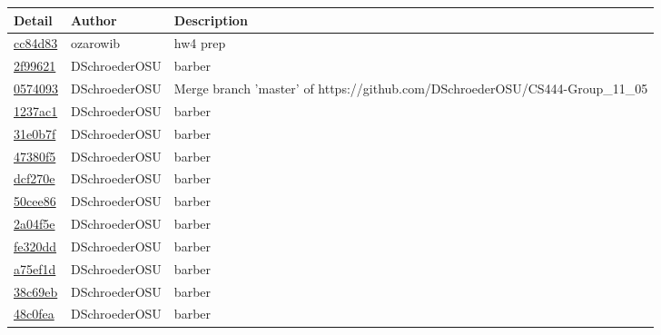 \documentclass[10pt,letterpaper,draftclsnofoot,onecolumn]{IEEEtran}
\begin{document}
\noindent\begin{tabular}{l l l}\textbf{Detail} & \textbf{Author} & \textbf{Description}\\\hline
\href{https://github.com/DSchroederOSU/CS444-Group\_11\_05/commit/cc84d834483d472b0d0c12d075555c2c3b960755}{cc84d83} & ozarowib & hw4 prep\\\hline
\href{https://github.com/DSchroederOSU/CS444-Group\_11\_05/commit/2f99621b3c19e6ce8239c9f4c1ea9f24902d77ee}{2f99621} & DSchroederOSU & barber\\\hline
\href{https://github.com/DSchroederOSU/CS444-Group\_11\_05/commit/0574093f826e27b1fc4e3d216da50c503b3015ed}{0574093} & DSchroederOSU & Merge branch 'master' of https://github.com/DSchroederOSU/CS444-Group\_11\_05\\\hline
\href{https://github.com/DSchroederOSU/CS444-Group\_11\_05/commit/1237ac17530a834d78a0d2a8d36924ec87a3c579}{1237ac1} & DSchroederOSU & barber\\\hline
\href{https://github.com/DSchroederOSU/CS444-Group\_11\_05/commit/31e0b7f7cf642c37f6cf6d436193976ea4d80ca7}{31e0b7f} & DSchroederOSU & barber\\\hline
\href{https://github.com/DSchroederOSU/CS444-Group\_11\_05/commit/47380f5ba2b7b07b547591b408d5e36e480b32ec}{47380f5} & DSchroederOSU & barber\\\hline
\href{https://github.com/DSchroederOSU/CS444-Group\_11\_05/commit/dcf270e08f46f7452e14335b29c5a1e64e54f015}{dcf270e} & DSchroederOSU & barber\\\hline
\href{https://github.com/DSchroederOSU/CS444-Group\_11\_05/commit/50cee86f1af5bc5267515775ee7cb5b64cf82418}{50cee86} & DSchroederOSU & barber\\\hline
\href{https://github.com/DSchroederOSU/CS444-Group\_11\_05/commit/2a04f5e125dc1d66e320fa5629d28a75e41261cf}{2a04f5e} & DSchroederOSU & barber\\\hline
\href{https://github.com/DSchroederOSU/CS444-Group\_11\_05/commit/fe320dd67de84fe204914ad796cb06ee25c01ac1}{fe320dd} & DSchroederOSU & barber\\\hline
\href{https://github.com/DSchroederOSU/CS444-Group\_11\_05/commit/a75ef1d948f1b3ceca8ce1bd3142de6910918576}{a75ef1d} & DSchroederOSU & barber\\\hline
\href{https://github.com/DSchroederOSU/CS444-Group\_11\_05/commit/38c69eb5be708dcb9530060fe04b4655e7d2469c}{38c69eb} & DSchroederOSU & barber\\\hline
\href{https://github.com/DSchroederOSU/CS444-Group\_11\_05/commit/48c0fea3eacec6b8552b0ae4bcd6b80f2bbc47a5}{48c0fea} & DSchroederOSU & barber\\\hline

\end{tabular}
\end{document}
